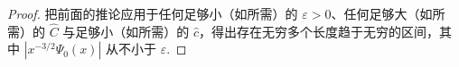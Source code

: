\begin{proof}
把前面的推论应用于任何足够小（如所需）的 $\varepsilon > 0$、任何足够大（如所需）的 $\hat{C}$ 与足够小（如所需）的 $\hat{c}$，得出存在无穷多个长度趋于无穷的区间，其中 $|x^{-3/2}\Psi_0(x)|$ 从不小于 $\varepsilon$.
\end{proof}


